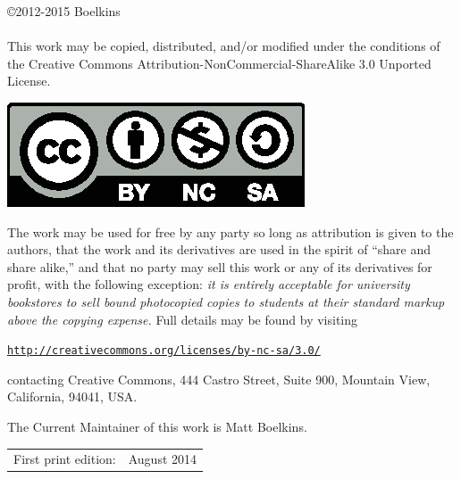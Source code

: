 \begingroup
\footnotesize
\parindent 0pt
\parskip \baselineskip
\copyright 2012-2015 Boelkins \\ \ \\

    This work may be copied, distributed, and/or modified under the conditions
of the Creative Commons Attribution-NonCommercial-ShareAlike 3.0 Unported License.  

\begin{center}
\includegraphics{figures/CClicense.eps}
\end{center}

The work may be used for free by any party so long as attribution is given to the authors, that the work and its derivatives are used in the spirit of ``share and share alike,'' and that no party may sell this work or any of its derivatives for profit, with the following exception:  \emph{it is entirely acceptable for university bookstores to sell bound photocopied copies to students at their standard markup above the copying expense.}  Full details may be found by visiting
\begin{center}
\href{http://creativecommons.org/licenses/by-nc-sa/3.0/}{\texttt{http://creativecommons.org/licenses/by-nc-sa/3.0/}}
\end{center} 
contacting Creative Commons, 444 Castro Street, Suite 900, Mountain View, California, 94041, USA. 

\vfill

    The Current Maintainer of this work is Matt Boelkins.



\begin{center}
\begin{tabular}{ll}
First print edition:  & August 2014 \\
\end{tabular}
\end{center}

\vfill

